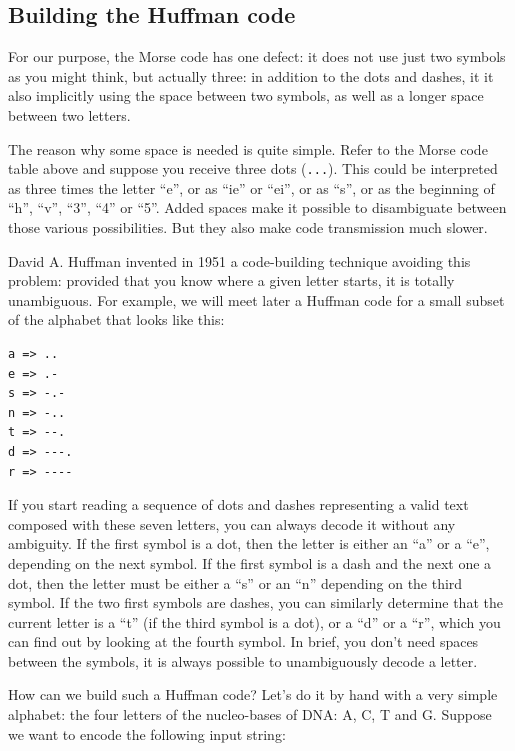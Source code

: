 \subsection{Building the Huffman code}

For our purpose, the Morse code has one defect: it does not 
use just two symbols as you might think, but actually three: 
in addition to the dots and dashes, it it also implicitly 
using the space between two symbols, as well as a longer space 
between two letters.

The reason why some space is needed is quite simple. Refer to the Morse 
code table above and suppose you receive three dots (\verb'...'). 
This could be interpreted as three times the letter ``e'', or as 
``ie'' or ``ei'', or as ``s'', or as the beginning of ``h'', ``v'', 
``3'', ``4'' or ``5''. Added spaces make it possible to disambiguate 
between those various possibilities. But they also make code 
transmission much slower.

David A. Huffman invented in 1951 a code-building technique avoiding 
this problem: provided that you know where a given letter starts, 
it is totally unambiguous. For example, we will meet later a Huffman 
code for a small subset of the alphabet that looks like this:

\begin{verbatim}
a => ..
e => .-
s => -.-
n => -..
t => --.
d => ---.
r => ----
\end{verbatim}

If you start reading a sequence of dots and dashes representing a 
valid text composed with these seven letters, you can always decode 
it without any ambiguity. If the first symbol is a dot, then the letter 
is either an ``a'' or a ``e'', depending on the next symbol. If the 
first symbol is a dash and the next one a dot, then the letter must 
be either a ``s'' or an ``n'' depending on the third symbol. If the 
two first symbols are dashes, you can similarly determine that the 
current letter is a ``t'' (if the third symbol is a dot), or a ``d'' 
or a ``r'', which you can find out by looking at the fourth symbol. 
In brief, you don't need spaces between the symbols, it is always 
possible to unambiguously decode a letter.

How can we build such a Huffman code? Let's do it by hand with a 
very simple alphabet: the four letters of the nucleo-bases of DNA: A, 
C, T and G. Suppose we want to encode the following input string:

